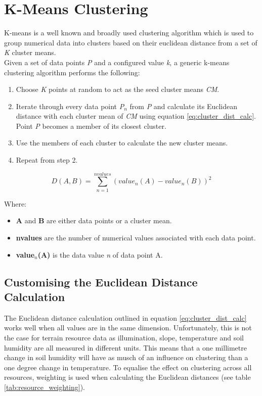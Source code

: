 \section{K-Means Clustering}

K-means is a well known and broadly used clustering algorithm which is used to group numerical data into clusters based on their euclidean distance from a set of \textit{K} cluster means.\\

Given a set of data points \textit{P} and a configured value \textit{k}, a generic k-means clustering algorithm performs the following:
\begin{enumerate}
\item Choose \textit{K} points at random to act as the seed cluster means \textit{CM}.
\item Iterate through every data point \textit{P$_{n}$} from \textit{P} and calculate its Euclidean distance with each cluster mean of \textit{CM} using equation \ref{eq:cluster_dist_calc}. Point \textit{P} becomes a member of its closest cluster. 
\item Use the members of each cluster to calculate the new cluster means. 
\item Repeat from step 2. 
\end{enumerate}

\begin{equation} \label{eq:cluster_dist_calc}
D(A,B) = \sum_{n=1}^{nvalues} (value_{n}(A) - value_{n}(B)) ^{2}
\end{equation}

Where:
\begin{itemize}
\item \textbf{A} and \textbf{B} are either data points or a cluster mean.
\item \textbf{nvalues} are the number of numerical values associated with each data point.
\item \textbf{value$_{n}$(A)} is the data value \textit{n} of data point A.
\end{itemize}

\subsection{Customising the Euclidean Distance Calculation}

The Euclidean distance calculation outlined in equation \ref{eq:cluster_dist_calc} works well when all values are in the same dimension. Unfortunately, this is not the case for terrain resource data as illumination, slope, temperature and soil humidity are all measured in different units. This means that a one millimetre change in soil humidity will have as musch of an influence on clustering than a one degree change in temperature. To equalise the effect on clustering across all resources, weighting is used when calculating the Euclidean distances (see table \ref{tab:resource_weighting}).

